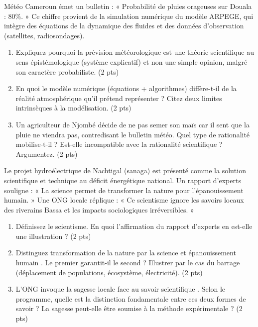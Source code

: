 \documentclass[11pt]{article}
\begin{document}
\begin{exercice}
Météo Cameroun émet un bulletin : « Probabilité de pluies orageuses sur Douala : 80\%. » Ce chiffre provient de la simulation numérique du modèle ARPEGE, qui intègre des équations de la dynamique des fluides et des données d'observation (satellites, radiosondages).

\begin{enumerate}
    \item Expliquez pourquoi la prévision météorologique est une \og théorie scientifique \fg{} au sens épistémologique (système explicatif) et non une simple opinion, malgré son caractère probabiliste. (2 pts)
    \item En quoi le modèle numérique (équations + algorithmes) diffère-t-il de la réalité atmosphérique qu'il prétend représenter ? Citez deux limites intrinsèques à la modélisation. (2 pts)
    \item Un agriculteur de Njombé décide de ne pas semer son maïs car il \og sent \fg{} que la pluie ne viendra pas, contredisant le bulletin météo. Quel type de rationalité mobilise-t-il ? Est-elle incompatible avec la rationalité scientifique ? Argumentez. (2 pts)
\end{enumerate}
\end{exercice}

\begin{exercice}
Le projet hydroélectrique de Nachtigal (sanaga) est présenté comme la solution scientifique et technique au déficit énergétique national. Un rapport d'experts souligne : « La science permet de transformer la nature pour l'épanouissement humain. » Une ONG locale réplique : « Ce scientisme ignore les savoirs locaux des riverains Bassa et les impacts sociologiques irréversibles. »

\begin{enumerate}
    \item Définissez le scientisme. En quoi l'affirmation du rapport d'experts en est-elle une illustration ? (2 pts)
    \item Distinguez \og transformation de la nature par la science \fg{} et \og épanouissement humain \fg{}. Le premier garantit-il le second ? Illustrer par le cas du barrage (déplacement de populations, écosystème, électricité). (2 pts)
    \item L'ONG invoque la \og sagesse \fg{} locale face au \og savoir scientifique \fg{}. Selon le programme, quelle est la distinction fondamentale entre ces deux formes de savoir ? La sagesse peut-elle être soumise à la méthode expérimentale ? (2 pts)
\end{enumerate}
\end{exercice}
\end{document}

